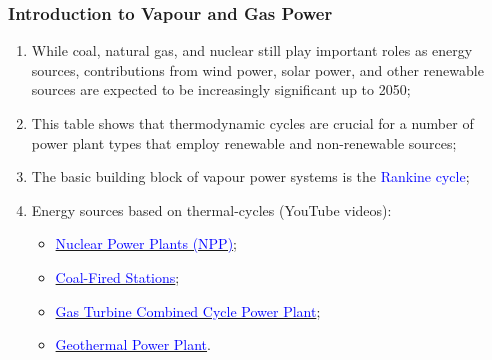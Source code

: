 \documentclass[10pt,compress]{beamer}
\begin{document}
\begin{frame}
 \frametitle{Introduction to Vapour and Gas Power}

    \begin{enumerate}%
     \item <1-> While coal, natural gas, and nuclear still play important roles as energy sources, contributions from wind power, solar power, and other renewable sources are expected to be increasingly significant up to 2050;
     \item <2-> This table shows that thermodynamic cycles are crucial for a number of power plant types that employ renewable and non-renewable sources;
     \item <3-> The basic building block of vapour power systems is the \textcolor{blue}{Rankine cycle};
     \item <4-> Energy sources based on thermal-cycles (YouTube videos):
        \begin{itemize}%
           \item \href{http://www.youtube.com/watch?v=_UwexvaCMWA}{\textcolor{blue}{Nuclear Power Plants (NPP)}};
           \item \href{http://www.youtube.com/watch?v=0mjT8ETB128}{\textcolor{blue}{Coal-Fired Stations}};
           \item \href{http://www.youtube.com/watch?v=oi1TRbiE_Kw}{\textcolor{blue}{Gas Turbine Combined Cycle Power Plant}};
           \item \href{https://www.youtube.com/watch?v=kjpp2MQffnw}{\textcolor{blue}{Geothermal Power Plant}}.
        \end{itemize}
    \end{enumerate}
 \normalsize
\end{frame}
\end{document}
